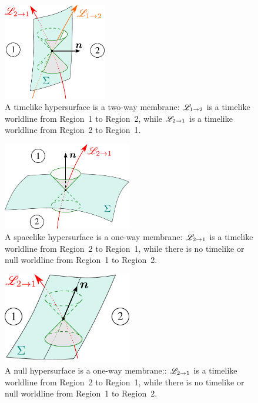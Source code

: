 \begin{figure}
\centerline{\includegraphics[width=0.4\textwidth]{def_timelike_2way.pdf}}
\caption[]{\label{f:def:timelike_2way} \footnotesize
A timelike hypersurface is a two-way membrane: $\mathscr{L}_{1\rightarrow 2}$ is
a timelike worldline from Region~1 to Region~2, while $\mathscr{L}_{2\rightarrow 1}$ is
a timelike worldline from Region~2 to Region~1.}
\end{figure}

\begin{figure}
\centerline{\includegraphics[width=0.5\textwidth]{def_spacelike_1way.pdf}}
\caption[]{\label{f:def:spacelike_1way} \footnotesize
A spacelike hypersurface is a one-way membrane: $\mathscr{L}_{2\rightarrow 1}$ is
a timelike worldline from Region~2 to Region~1, while there is no timelike or null
worldline from Region~1 to Region~2.}
\end{figure}

\begin{figure}
\centerline{\includegraphics[width=0.5\textwidth]{def_null_1way.pdf}}
\caption[]{\label{f:def:null_1way} \footnotesize
A null hypersurface is a one-way membrane:: $\mathscr{L}_{2\rightarrow 1}$ is
a timelike worldline from Region~2 to Region~1, while there is no timelike or null
worldline from Region~1 to Region~2.}
\end{figure}

